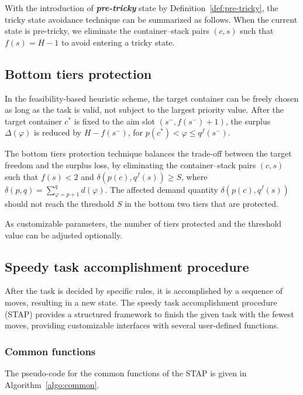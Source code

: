 \documentclass[review,3p,times,12pt,number]{elsarticle}\usepackage{amsmath}\usepackage{amssymb}
\renewcommand{\emph}[1]{\textbf{\textit{#1}}}
\begin{document}
With the introduction of \emph{pre-tricky} state by Definition~\ref{def:pre-tricky}, the tricky state avoidance technique can be summarized as follows. When the current state is pre-tricky, we eliminate the container--stack pairs $(c,s)$ such that $f(s)=H-1$ to avoid entering a tricky state.

\subsection{Bottom tiers protection}

In the feasibility-based heuristic scheme, the target container can be freely chosen as long as the task is valid, not subject to the largest priority value. After the target container $c^*$ is fixed to the aim slot $(s^-,f(s^-)+1)$, the surplus $\Delta(\varphi)$ is reduced by $H-f(s^-)$, for $p(c^*)< \varphi\le q^f(s^-)$.

The bottom tiers protection technique balances the trade-off between the target freedom and the surplus loss, by eliminating the container--stack pairs $(c,s)$ such that $f(s)<2$ and $\delta(p(c),q^f(s))\ge S$, where $\delta(p,q)=\sum_{\varphi=p+1}^{q}d(\varphi)$. The affected demand quantity $\delta(p(c),q^f(s))$ should not reach the threshold $S$ in the bottom two tiers that are protected.  

As customizable parameters, the number of tiers protected and the threshold value can be adjusted optionally.

\subsection{Speedy task accomplishment procedure}

\label{sec:speedy}

After the task is decided by specific rules, it is accomplished by a sequence of moves, resulting in a new state. The speedy task accomplishment procedure (STAP) provides a structured framework to finish the given task with the fewest moves, providing customizable interfaces with several user-defined functions. 

\subsubsection{Common functions}

The pseudo-code for the common functions of the STAP is given in Algorithm~\ref{algo:common}.
\end{document}
